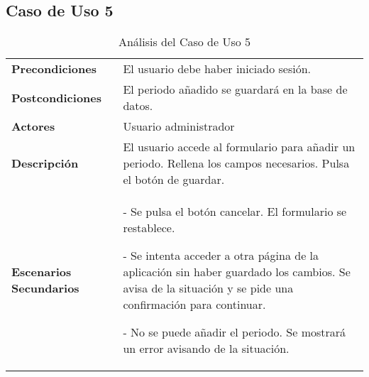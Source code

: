\subsection{Caso de Uso 5}
\begin{table}[H]
  \centering
  \vspace{-5mm}
  \caption{Análisis del Caso de Uso 5}
    \begin{tabular}{p{7.5em}p{24.145em}}
    \toprule
    \rowcolor[rgb]{ .871,  .918,  .965} \multicolumn{2}{p{31.645em}}{\textbf{Añadir periodo}} \\
    \midrule
    \rowcolor[rgb]{ .906,  .902,  .902} \textbf{Precondiciones} & \cellcolor[rgb]{ 1,  1,  1}El usuario debe haber iniciado sesión. \\
    \midrule
    \rowcolor[rgb]{ .906,  .902,  .902} \textbf{Postcondiciones} & \cellcolor[rgb]{ 1,  1,  1}El periodo añadido se guardará en la base de datos. \\
    \midrule
    \rowcolor[rgb]{ .906,  .902,  .902} \textbf{Actores} & \cellcolor[rgb]{ 1,  1,  1}Usuario administrador \\
    \midrule
    \rowcolor[rgb]{ .906,  .902,  .902} \textbf{Descripción} & \cellcolor[rgb]{ 1,  1,  1}El usuario accede al formulario para añadir un periodo. Rellena los campos necesarios. Pulsa el botón de guardar. \\
    \midrule
    \rowcolor[rgb]{ .906,  .902,  .902} \textbf{Escenarios          Secundarios} & \cellcolor[rgb]{ 1,  1,  1}- Se pulsa el botón cancelar. El formulario se restablece.\par - Se intenta acceder a otra página de la aplicación sin haber guardado los cambios. Se avisa de la situación y se pide una confirmación para continuar.\par - No se puede añadir el periodo. Se mostrará un error avisando de la situación. \\
    \bottomrule
    \end{tabular}%
\end{table}%
 
